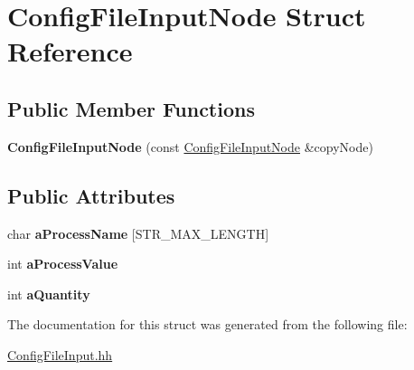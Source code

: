 \hypertarget{struct_config_file_input_node}{}\section{Config\+File\+Input\+Node Struct Reference}
\label{struct_config_file_input_node}
\subsection*{Public Member Functions}
\begin{DoxyCompactItemize}
\item 
{\bfseries Config\+File\+Input\+Node} (const \hyperlink{struct_config_file_input_node}{Config\+File\+Input\+Node} \&copy\+Node)\hypertarget{struct_config_file_input_node_a69ceebec9a7bae4b3223a3dbfad03629}{}\label{struct_config_file_input_node_a69ceebec9a7bae4b3223a3dbfad03629}

\end{DoxyCompactItemize}
\subsection*{Public Attributes}
\begin{DoxyCompactItemize}
\item 
char {\bfseries a\+Process\+Name} \mbox{[}S\+T\+R\+\_\+\+M\+A\+X\+\_\+\+L\+E\+N\+G\+TH\mbox{]}\hypertarget{struct_config_file_input_node_a93ab4bcc86e96f4845b7a7ee05017d0b}{}\label{struct_config_file_input_node_a93ab4bcc86e96f4845b7a7ee05017d0b}

\item 
int {\bfseries a\+Process\+Value}\hypertarget{struct_config_file_input_node_aa82078bb2516e104d5656eaaa5e3222e}{}\label{struct_config_file_input_node_aa82078bb2516e104d5656eaaa5e3222e}

\item 
int {\bfseries a\+Quantity}\hypertarget{struct_config_file_input_node_a9a15b85b3b8b6215fed75d90cf07d9e4}{}\label{struct_config_file_input_node_a9a15b85b3b8b6215fed75d90cf07d9e4}

\end{DoxyCompactItemize}


The documentation for this struct was generated from the following file\+:\begin{DoxyCompactItemize}
\item 
\hyperlink{_config_file_input_8hh}{Config\+File\+Input.\+hh}\end{DoxyCompactItemize}
